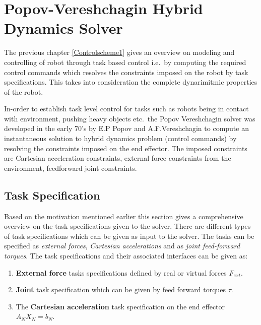 
\chapter{Popov-Vereshchagin Hybrid Dynamics Solver}
\label{PVS}
The previous chapter \ref{Controlscheme1}  gives an overview on modeling and controlling of robot through task based control i.e.\ by computing the required control commands which resolves the constraints imposed on the robot by task specifications. This takes into consideration the complete dynarimitmic properties of the robot. 
\par
In-order to establish task level control for tasks such as robots being in contact with environment, pushing heavy objects etc.\, the Popov Vereshchagin solver \cite{vereshchagin1974computer,popov1978manipuljacionnyje,vereshchagin1989modeling} was developed in the early 70's by E.P Popov and A.F.Vereshchagin to compute an instantaneous solution to hybrid dynamics problem (control commands) by resolving the constraints imposed on the end effector. The imposed constraints are Cartesian acceleration constraints, external force constraints from the environment, feedforward joint constraints. 
\section{Task Specification}
Based on the motivation mentioned earlier this section gives a comprehensive overview on the task specifications given to the solver. There are different types of task specifications which can be given as input to the solver. The tasks can be specified as \textit{external forces}, \textit{Cartesian accelerations} and as \textit{joint feed-forward torques}. The task specifications and their associated interfaces can be given as:
\begin{enumerate}
	\item \textbf{External force} tasks specifications defined by real or virtual forces {$F_{ext}$}.
	\item \textbf{Joint} task specification which can be given by feed forward torques {$\tau$}.
	\item The \textbf{Cartesian acceleration} task specification on the end effector {$A_{N}\ddot{X}_{N} = b_{N}$}.
\end{enumerate}


